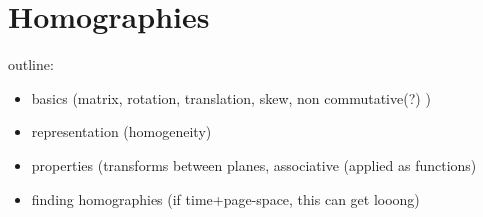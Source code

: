 \section{Homographies}
outline:%
\begin{itemize}
	\item basics (matrix, rotation, translation, skew, non commutative(?) )
	\item representation (homogeneity)
	\item properties (transforms between planes, associative (applied as
	functions)
	\item finding homographies (if time+page-space, this can get looong)
\end{itemize}
